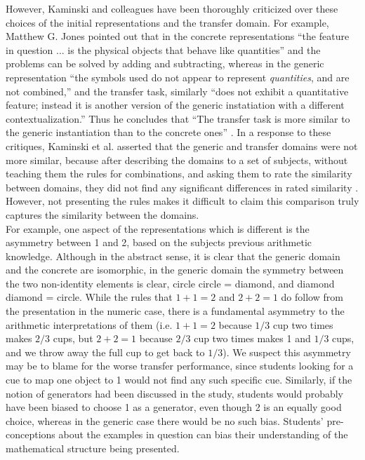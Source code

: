 \documentclass[11pt]{article}
\begin{document}
However, Kaminski and colleagues have been thoroughly criticized over these choices of the initial representations and the transfer domain. For example, Matthew G. Jones pointed out that in the concrete representations ``the feature in question ... is the physical objects that behave like quantities'' and the problems can be solved by adding and subtracting, whereas in the generic representation ``the symbols used do not appear to represent \emph{quantities}, and are not combined,'' and the transfer task, similarly ``does not exhibit a quantitative feature; instead it is another version of the generic instatiation with a different contextualization.'' Thus he concludes that ``The transfer task is more similar to the generic instantiation than to the concrete ones'' \cite{Jones2009}. In a response to these critiques, Kaminski et al. asserted that the generic and transfer domains were not more similar, because after describing the domains to a set of subjects, without teaching them the rules for combinations, and asking them to rate the similarity between domains, they did not find any significant differences in rated similarity \cite{Kaminski2009}. However, not presenting the rules makes it difficult to claim this comparison truly captures the similarity between the domains. \\[11pt]
For example, one aspect of the representations which is different is the asymmetry between 1 and 2, based on the subjects previous arithmetic knowledge. Although in the abstract sense, it is clear that the generic domain and the concrete are isomorphic, in the generic domain the symmetry between the two non-identity elements is clear, circle circle = diamond, and diamond diamond = circle. While the rules that $1+1=2$ and $2+2=1$ do follow from the presentation in the numeric case, there is a fundamental asymmetry to the arithmetic interpretations of them (i.e. $1+1 = 2$ because $1/3$ cup two times makes $2/3$ cups, but $2+2 = 1$ because $2/3$ cup two times makes 1 and $1/3$ cups, and we throw away the full cup to get back to $1/3$). We suspect this asymmetry may be to blame for the worse transfer performance, since students looking for a cue to map one object to 1 would not find any such specific cue. Similarly, if the notion of generators had been discussed in the study, students would probably have been biased to choose 1 as a generator, even though 2 is an equally good choice, whereas in the generic case there would be no such bias. Students' pre-conceptions about the examples in question can bias their understanding of the mathematical structure being presented. \\[11pt]
\end{document}
